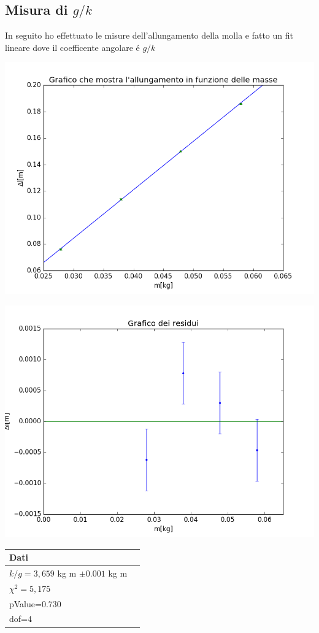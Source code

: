 \documentclass{exam}
\begin{document}
		\subsection{Misura di $g/k$}
			In seguito ho effettuato le misure dell'allungamento della molla e fatto un fit lineare dove il coefficente angolare \'e $g/k$\\
			\begin{minipage}{0.5\textwidth}
					\includegraphics[width=\textwidth]{fit_kg}
			\end{minipage}
			\begin{minipage}{0.5\textwidth}
					\includegraphics[width=\textwidth]{red_kg}
			\end{minipage}
				\begin{center}
				\begin{tabular}{ll}
						\toprule
						Dati \\
						\midrule
						$k/g=3,659$ kg m $\pm0.001$ kg m\\
						$\chi^2=5,175$\\
						pValue=$0.730$\\
						dof=$4$\\		
						\bottomrule	
					\end{tabular}
				\end{center}
\end{document}
